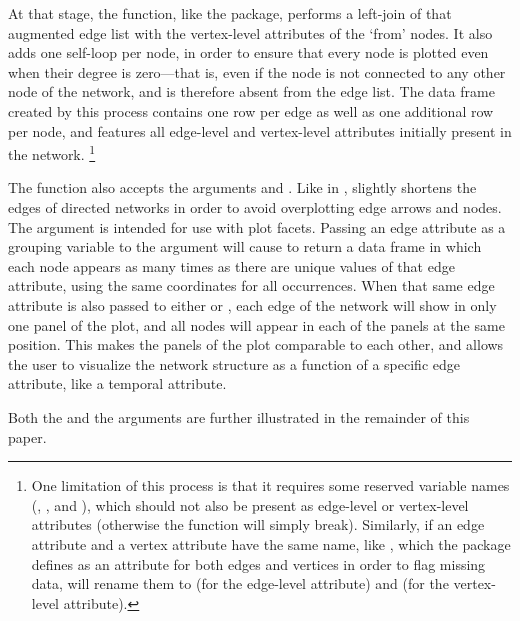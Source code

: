 At that stage, the  function, like the  package, performs a left-join of that augmented edge list with the vertex-level attributes of the %
`from' nodes. It also adds one self-loop per node, in order to ensure that every node is plotted even when their degree is zero---that is, even if the node is not connected to any other node of the network, and is therefore absent from the edge list. The data frame created by this process contains one row per edge as well as one additional row per node, and features all edge-level and vertex-level attributes initially present in the network.%
\footnote{One limitation of this process is that it requires some reserved variable names (, ,  and ), which should not also be present as edge-level or vertex-level attributes (otherwise the function will simply break). Similarly, if an edge attribute and a vertex attribute have the same name, like  , which the  package defines as an attribute for both edges and vertices in order to flag missing data,  will rename them to  (for the edge-level attribute) and  (for the vertex-level attribute).} %

The  function also accepts the arguments  and . Like in ,  slightly shortens the edges of directed networks in order to avoid overplotting edge arrows and nodes. The argument  is intended for use with plot facets. Passing an edge attribute as a grouping variable to the  argument will cause  to return a data frame in which each node appears as many times as there are unique values of that edge attribute, using the same coordinates for all occurrences. When that same edge attribute is also passed to either  or , each edge of the network will show in only one panel of the plot, and all nodes will appear in each of the panels at the same position. This makes the panels of the plot comparable to each other, and allows the user to visualize %
the network structure as a function of a specific edge attribute, like a temporal attribute.

Both the  and the  arguments are further illustrated in the remainder of this paper.


%
